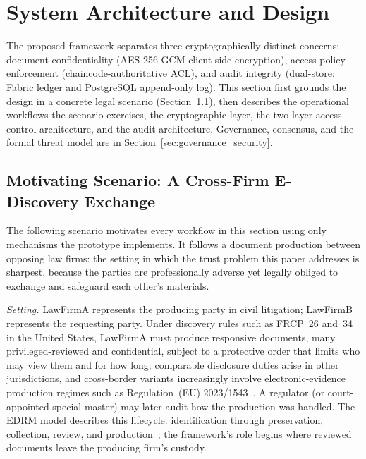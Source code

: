 \documentclass[preprint,12pt]{elsarticle}
\begin{document}
\section{System Architecture and Design}
\label{sec:system_arch}

The proposed framework separates three cryptographically distinct
concerns: document confidentiality (AES-256-GCM client-side
encryption), access policy enforcement (chaincode-authoritative ACL),
and audit integrity (dual-store: Fabric ledger and PostgreSQL
append-only log). This section first grounds the design in a concrete
legal scenario (Section~\ref{sec:scenario}), then describes the
operational workflows the scenario exercises, the cryptographic layer,
the two-layer access control architecture, and the audit architecture.
Governance, consensus, and the formal
threat model are in Section~\ref{sec:governance_security}.

\subsection{Motivating Scenario: A Cross-Firm E-Discovery Exchange}
\label{sec:scenario}

The following scenario motivates every workflow in this section using
only mechanisms the prototype implements. It follows a document
production between opposing law firms: the setting in which the
trust problem this paper addresses is sharpest, because the parties
are professionally adverse yet legally obliged to exchange and
safeguard each other's materials.

\emph{Setting.} LawFirmA represents the producing party in civil
litigation; LawFirmB represents the requesting party. Under discovery
rules such as FRCP~26 and~34 in the United States, LawFirmA must
produce responsive documents, many privileged-reviewed and
confidential, subject to a protective order that limits who may view
them and for how long; comparable disclosure duties arise in other
jurisdictions, and cross-border variants increasingly involve
electronic-evidence production regimes such as Regulation~(EU)
2023/1543~\cite{euEvidence2023}. A regulator (or court-appointed
special master) may later audit how the production was handled. The
EDRM model describes this lifecycle: identification through
preservation, collection, review, and production~\cite{edrm2023}; the
framework's role begins where reviewed documents leave the producing
firm's custody.
\end{document}
